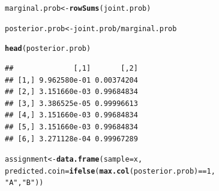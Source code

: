 \documentclass[11pt, a4paper]{article}\usepackage[]{graphicx}\usepackage[]{xcolor}
\makeatletter
\newcommand{\hlnum}[1]{\textcolor[rgb]{0.686,0.059,0.569}{#1}}%
\newcommand{\hlsng}[1]{\textcolor[rgb]{0.192,0.494,0.8}{#1}}%
\newcommand{\hlopt}[1]{\textcolor[rgb]{0,0,0}{#1}}%
\newcommand{\hldef}[1]{\textcolor[rgb]{0.345,0.345,0.345}{#1}}%
\newcommand{\hlkwb}[1]{\textcolor[rgb]{0.69,0.353,0.396}{#1}}%
\newcommand{\hlkwc}[1]{\textcolor[rgb]{0.333,0.667,0.333}{#1}}%
\newcommand{\hlkwd}[1]{\textcolor[rgb]{0.737,0.353,0.396}{\textbf{#1}}}%
\newenvironment{kframe}{%
 \def\at@end@of@kframe{}%
 \ifinner\ifhmode%
  \def\at@end@of@kframe{\end{minipage}}%
  \begin{minipage}{\columnwidth}%
 \fi\fi%
 \def\FrameCommand##1{\hskip\@totalleftmargin \hskip-\fboxsep
 \colorbox{shadecolor}{##1}\hskip-\fboxsep
     \hskip-\linewidth \hskip-\@totalleftmargin \hskip\columnwidth}%
 \MakeFramed {\advance\hsize-\width
   \@totalleftmargin\z@ \linewidth\hsize
   \@setminipage}}%
 {\par\unskip\endMakeFramed%
 \at@end@of@kframe}
\newenvironment{knitrout}{}{} %
\makeatother
\begin{document}
\begin{enumerate}
\begin{knitrout}
\color{fgcolor}\begin{kframe}
\begin{alltt}
\hldef{marginal.prob} \hlkwb{<-} \hlkwd{rowSums}\hldef{(joint.prob)}
\end{alltt}
\end{kframe}
\end{knitrout}
 
\begin{knitrout}
\color{fgcolor}\begin{kframe}
\begin{alltt}
\hldef{posterior.prob} \hlkwb{<-} \hldef{joint.prob} \hlopt{/} \hldef{marginal.prob}
\end{alltt}
\end{kframe}
\end{knitrout}

\begin{knitrout}
\color{fgcolor}\begin{kframe}
\begin{alltt}
\hlkwd{head}\hldef{(posterior.prob)}
\end{alltt}
\begin{verbatim}
##              [,1]       [,2]
## [1,] 9.962580e-01 0.00374204
## [2,] 3.151660e-03 0.99684834
## [3,] 3.386525e-05 0.99996613
## [4,] 3.151660e-03 0.99684834
## [5,] 3.151660e-03 0.99684834
## [6,] 3.271128e-04 0.99967289
\end{verbatim}
\end{kframe}
\end{knitrout}

\begin{knitrout}
\color{fgcolor}\begin{kframe}
\begin{alltt}
\hldef{assignment} \hlkwb{<-} \hlkwd{data.frame}\hldef{(}\hlkwc{sample} \hldef{= x,}
                         \hlkwc{predicted.coin} \hldef{=} \hlkwd{ifelse}\hldef{(}\hlkwd{max.col}\hldef{(posterior.prob)} \hlopt{==} \hlnum{1}\hldef{,}
                                                 \hlsng{"A"}\hldef{,} \hlsng{"B"}\hldef{))}
\end{alltt}
\end{kframe}
\end{knitrout}



\end{enumerate}
\end{document}
